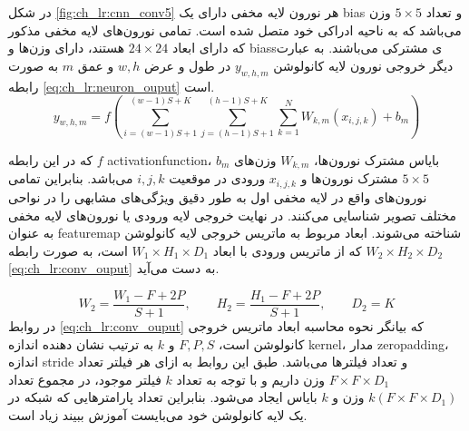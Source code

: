در شکل \ref{fig:ch_lr:cnn_conv5} هر نورون لایه مخفی دارای یک \gls{bias} و تعداد $5\times 5$ وزن می‌باشد که به  ناحیه ادراکی خود متصل شده است. تمامی نورون‌های لایه مخفی مذکور که دارای ابعاد $24\times 24$ هستند، دارای وزن‌ها و \glspl{bias}ی مشترکی می‌باشند. به عبارت دیگر خروجی نورون لایه کانولوشن $y_{w,h,m}$ در طول و عرض $w,h$ و عمق $m$ به صورت رابطه \ref{eq:ch_lr:neuron_ouput} است.
\begin{equation}
	y_{w,h,m} = f\left(\sum_{i=(w-1)S+1}^{(w-1)S+K} \sum_{j=(h-1)S+1}^{(h-1)S+K} \sum_{k=1}^{N} W_{k,m}(x_{i,j,k})+b_m\right)
	\label{eq:ch_lr:neuron_ouput}
\end{equation}

که در این رابطه $f$ \gls{activationfunction}، $b_m$ بایاس مشترک نورون‌ها، $W_{k,m}$ وز‌ن‌های $5\times 5$ مشترک نورون‌ها و $x_{i,j,k}$ ورودی در موقعیت $i,j,k$ می‌باشد. بنابراین تمامی نورون‌های واقع در لایه مخفی اول به طور دقیق ویژگی‌های مشابهی را در نواحی مختلف تصویر شناسایی می‌کنند. در نهایت خروجی لایه ورودی یا نورون‌های لایه مخفی به عنوان \gls{featuremap} شناخته می‌شوند. ابعاد مربوط به ماتریس خروجی لایه کانولوشن $W_2\times H_2 \times D_2$ که از ماتریس ورودی با ابعاد $W_1\times H_1 \times D_1$ است، به صورت رابطه \ref{eq:ch_lr:conv_ouput} به دست می‌آید.

\begin{equation}
	W_2 = \frac{W_1-F+2P}{S+1}, \qquad H_2=\frac{H_1-F+2P}{S+1}, \qquad D_2=K
	\label{eq:ch_lr:conv_ouput}
\end{equation}
در روابط \ref{eq:ch_lr:conv_ouput} که بیانگر نحوه محاسبه ابعاد ماتریس خروجی کانولوشن است،
$F, P, S$ و $k$
به ترتیب نشان دهنده اندازه \gls{kernel}، مدار \gls{zeropadding}، اندازه \gls{stride} و تعداد فیلترها می‌باشد. طبق این روابط به ازای هر فیلتر تعداد $F\times F\times D_1$ وزن داریم و با توجه به تعداد $k$ فیلتر موجود، در مجموع تعداد $k(F\times F\times D_1)$ وزن و $k$ بایاس ایجاد می‌شود. بنابراین تعداد پارامترهایی که شبکه در یک لایه کانولوشن خود می‌بایست آموزش ببیند زیاد است.

